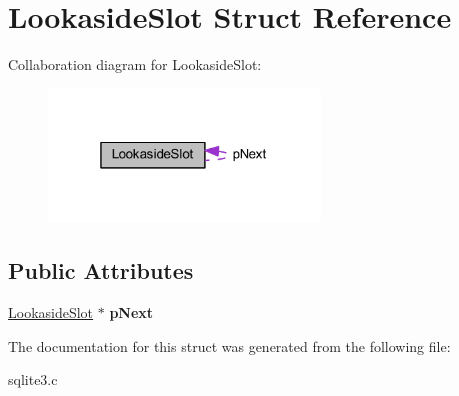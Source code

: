 \hypertarget{struct_lookaside_slot}{\section{Lookaside\-Slot Struct Reference}
\label{struct_lookaside_slot}
}


Collaboration diagram for Lookaside\-Slot\-:\nopagebreak
\begin{figure}[H]
\begin{center}
\leavevmode
\includegraphics[width=205pt]{struct_lookaside_slot__coll__graph}
\end{center}
\end{figure}
\subsection*{Public Attributes}
\begin{DoxyCompactItemize}
\item 
\hypertarget{struct_lookaside_slot_a3c3dd4a770ded51a68e8a651eba40f66}{\hyperlink{struct_lookaside_slot}{Lookaside\-Slot} $\ast$ {\bfseries p\-Next}}\label{struct_lookaside_slot_a3c3dd4a770ded51a68e8a651eba40f66}

\end{DoxyCompactItemize}


The documentation for this struct was generated from the following file\-:\begin{DoxyCompactItemize}
\item 
sqlite3.\-c\end{DoxyCompactItemize}
